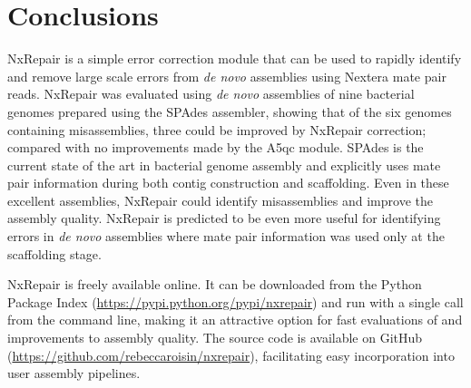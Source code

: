 \section{Conclusions}
NxRepair is a simple error correction module that can be used to rapidly identify and remove large scale errors from \textit{de novo} assemblies using Nextera mate pair reads. NxRepair was evaluated using \textit{de novo} assemblies of nine bacterial genomes prepared using the SPAdes assembler, showing that of the six genomes containing misassemblies, three could be improved by NxRepair correction; compared with no improvements made by the A5qc module. SPAdes is the current state of the art in bacterial genome assembly and explicitly uses mate pair information during both contig construction and scaffolding. Even in these excellent assemblies, NxRepair could identify misassemblies and improve the assembly quality. NxRepair is predicted to be even more useful for identifying errors in \textit{de novo} assemblies where mate pair information was used only at the scaffolding stage. 

NxRepair is freely available online. It can be downloaded from the Python Package Index (\url{https://pypi.python.org/pypi/nxrepair}) and run with a single call from the command line, making it an attractive option for fast evaluations of and improvements to assembly quality. The source code is available on GitHub (\url{https://github.com/rebeccaroisin/nxrepair}), facilitating easy incorporation into user assembly pipelines.  
